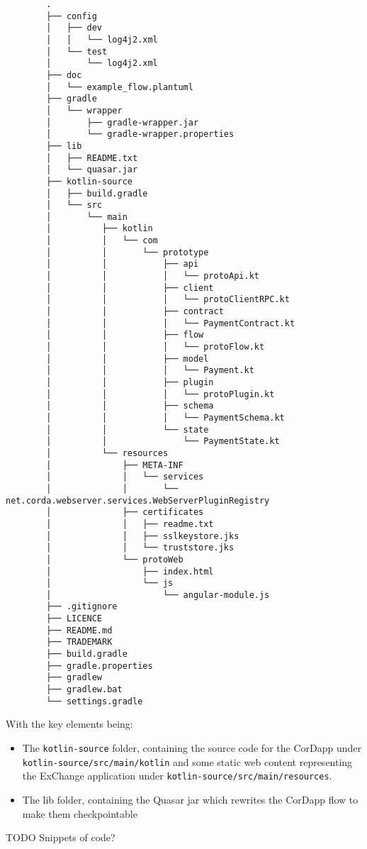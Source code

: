 \begin{tiny}
    \begin{verbatim}
        .
        ├── config
        │   ├── dev
        │   │   └── log4j2.xml
        │   └── test
        │       └── log4j2.xml
        ├── doc
        │   └── example_flow.plantuml
        ├── gradle
        │   └── wrapper
        │       ├── gradle-wrapper.jar
        │       └── gradle-wrapper.properties
        ├── lib
        │   ├── README.txt
        │   └── quasar.jar
        ├── kotlin-source
        │   ├── build.gradle
        │   └── src
        │       └── main
        │          ├── kotlin
        │          │   └── com
        │          │       └── prototype
        │          │           ├── api
        │          │           │   └── protoApi.kt
        │          │           ├── client
        │          │           │   └── protoClientRPC.kt
        │          │           ├── contract
        │          │           │   └── PaymentContract.kt
        │          │           ├── flow
        │          │           │   └── protoFlow.kt
        │          │           ├── model
        │          │           │   └── Payment.kt
        │          │           ├── plugin
        │          │           │   └── protoPlugin.kt
        │          │           ├── schema
        │          │           │   └── PaymentSchema.kt
        │          │           └── state
        │          │               └── PaymentState.kt
        │          └── resources
        │              ├── META-INF
        │              │   └── services
        │              │       └── net.corda.webserver.services.WebServerPluginRegistry
        │              ├── certificates
        │              │   ├── readme.txt
        │              │   ├── sslkeystore.jks
        │              │   └── truststore.jks
        │              └── protoWeb
        │                  ├── index.html
        │                  └── js
        │                      └── angular-module.js
        ├── .gitignore
        ├── LICENCE
        ├── README.md
        ├── TRADEMARK
        ├── build.gradle
        ├── gradle.properties
        ├── gradlew
        ├── gradlew.bat
        └── settings.gradle
    \end{verbatim}

\end{tiny}

With the key elements being:
\begin{itemize}
    \item The \verb|kotlin-source| folder, containing the source code for the CorDapp under \verb|kotlin-source/src/main/kotlin| and some static web content representing the ExChange application under \verb|kotlin-source/src/main/resources|.
    \item The lib folder, containing the Quasar jar which rewrites the CorDapp flow to make them checkpointable
\end{itemize}



TODO Snippets of code?